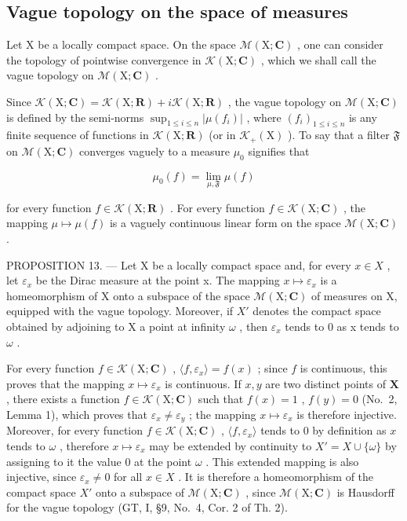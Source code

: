 \subsection{Vague topology on the space of measures}

Let X be a locally compact space. On the space \(\mathcal{M}(\mathrm{X};\mathbf{C})\) , one can consider the topology of pointwise convergence in \(\mathcal{K}(\mathrm{X};\mathbf{C})\) , which we shall call the vague topology on \(\mathcal{M}(\mathrm{X};\mathbf{C})\) .

Since \(\mathcal{K}(\mathrm{X};\mathbf{C}) = \mathcal{K}(\mathrm{X};\mathbf{R}) + i\mathcal{K}(\mathrm{X};\mathbf{R})\) , the vague topology on \(\mathcal{M}(\mathrm{X};\mathbf{C})\) is defined by the semi-norms \(\sup_{1\leqslant i\leqslant n}|\mu (f_i)|\) , where \((f_i)_{1\leqslant i\leqslant n}\) is any finite sequence of functions in \(\mathcal{K}(\mathrm{X};\mathbf{R})\) (or in \(\mathcal{K}_{+}(\mathrm{X})\) ). To say that a filter \(\mathfrak{F}\) on \(\mathcal{M}(\mathrm{X};\mathbf{C})\) converges vaguely to a measure \(\mu_0\) signifies that

\[
\mu_ {0} (f) = \lim _ {\mu , \mathfrak {F}} \mu (f)
\]

for every function \(f \in \mathcal{K}(\mathrm{X};\mathbf{R})\) . For every function \(f \in \mathcal{K}(\mathrm{X};\mathbf{C})\) , the mapping \(\mu \mapsto \mu(f)\) is a vaguely continuous linear form on the space \(\mathcal{M}(\mathrm{X};\mathbf{C})\) .

PROPOSITION 13. --- Let X be a locally compact space and, for every \(x \in X\) , let \(\varepsilon_{x}\) be the Dirac measure at the point x. The mapping \(x \mapsto \varepsilon_{x}\) is a homeomorphism of X onto a subspace of the space \(\mathcal{M}(\mathrm{X};\mathbf{C})\) of measures on X, equipped with the vague topology. Moreover, if \(X'\) denotes the compact space obtained by adjoining to X a point at infinity \(\omega\) , then \(\varepsilon_{x}\) tends to 0 as x tends to \(\omega\) .

For every function \(f \in \mathcal{K}(\mathrm{X};\mathbf{C})\) , \(\langle f,\varepsilon_x\rangle = f(x)\) ; since \(f\) is continuous, this proves that the mapping \(x \mapsto \varepsilon_x\) is continuous. If \(x,y\) are two distinct points of \(\mathbf{X}\) , there exists a function \(f \in \mathcal{K}(\mathrm{X};\mathbf{C})\) such that \(f(x) = 1\) , \(f(y) = 0\) (No.~2, Lemma 1), which proves that \(\varepsilon_x \neq \varepsilon_y\) ; the mapping \(x \mapsto \varepsilon_x\) is therefore injective. Moreover, for every function \(f \in \mathcal{K}(\mathrm{X};\mathbf{C})\) , \(\langle f,\varepsilon_x\rangle\) tends to 0 by definition as \(x\) tends to \(\omega\) , therefore \(x \mapsto \varepsilon_x\) may be extended by continuity to \(X' = X \cup \{\omega\}\) by assigning to it the value 0 at the point \(\omega\) . This extended mapping is also injective, since \(\varepsilon_x \neq 0\) for all \(x \in X\) . It is therefore a homeomorphism of the compact space \(X'\) onto a subspace of \(\mathcal{M}(\mathrm{X};\mathbf{C})\) , since \(\mathcal{M}(\mathrm{X};\mathbf{C})\) is Hausdorff for the vague topology (GT, I, §9, No.~4, Cor. 2 of Th. 2).

